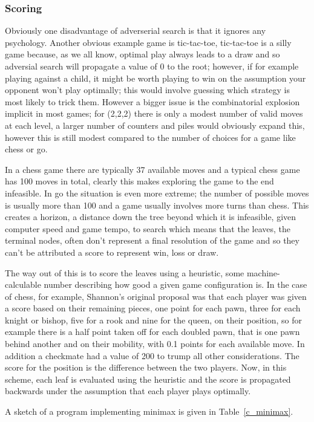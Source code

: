 \documentclass[11pt,a4paper]{scrartcl}
\begin{document}
\subsubsection*{Scoring}
Obviously one disadvantage of adverserial search is that it ignores
any psychology. Another obvious example game is tic-tac-toe,
tic-tac-toe is a silly game because, as we all know, optimal play
always leads to a draw and so adversial search will propagate a value
of 0 to the root; however, if for example playing against a child, it
might be worth playing to win on the assumption your opponent won't
play optimally; this would involve guessing which strategy is most
likely to trick them. However a bigger issue is the combinatorial
explosion implicit in most games; for (2,2,2) there is only a modest
number of valid moves at each level, a larger number of counters and
piles would obviously expand this, however this is still modest
compared to the number of choices for a game like chess or go.

In a chess game there are typically 37 available moves and a typical
chess game has 100 moves in total, clearly this makes exploring the
game to the end infeasible. In go the situation is even more extreme;
the number of possible moves is usually more than 100 and a game
usually involves more turns than chess. This creates a horizon, a
distance down the tree beyond which it is infeasible, given computer
speed and game tempo, to search which means that the leaves, the
terminal nodes, often don't represent a final resolution of the game
and so they can't be attributed a score to represent win, loss or
draw.

The way out of this is to score the leaves using a heuristic, some
machine-calculable number describing how good a given game
configuration is. In the case of chess, for example, Shannon's
original proposal was that each player was given a score based on
their remaining pieces, one point for each pawn, three for each knight
or bishop, five for a rook and nine for the queen, on their position,
so for example there is a half point taken off for each doubled pawn,
that is one pawn behind another and on their mobility, with 0.1 points
for each available move. In addition a checkmate had a value of 200 to
trump all other considerations. The score for the position is the
difference between the two players. Now, in this scheme, each leaf is
evaluated using the heuristic and the score is propagated backwards
under the assumption that each player plays optimally.

A sketch of a program implementing minimax is given in
Table~\ref{c_minimax}.
   
\end{document}
